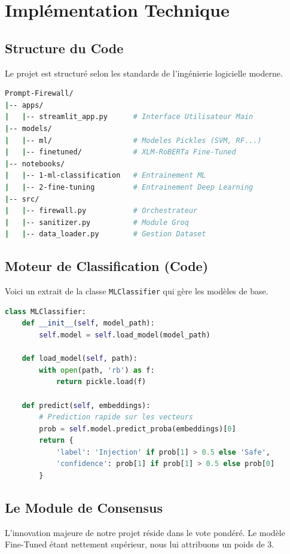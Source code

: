 \documentclass[a4paper,12pt]{report}
\begin{document}
\chapter{Implémentation Technique}

\section{Structure du Code}
Le projet est structuré selon les standards de l'ingénierie logicielle moderne.

\begin{lstlisting}[language=bash, caption=Arborescence du Projet]
Prompt-Firewall/
|-- apps/
|   |-- streamlit_app.py      # Interface Utilisateur Main
|-- models/
|   |-- ml/                   # Modeles Pickles (SVM, RF...)
|   |-- finetuned/            # XLM-RoBERTa Fine-Tuned
|-- notebooks/
|   |-- 1-ml-classification   # Entrainement ML
|   |-- 2-fine-tuning         # Entrainement Deep Learning
|-- src/
|   |-- firewall.py           # Orchestrateur
|   |-- sanitizer.py          # Module Groq
|   |-- data_loader.py        # Gestion Dataset
\end{lstlisting}

\section{Moteur de Classification (Code)}
Voici un extrait de la classe \texttt{MLClassifier} qui gère les modèles de base.

\begin{lstlisting}[language=Python, caption=Chargement et Prédiction ML]
class MLClassifier:
    def __init__(self, model_path):
        self.model = self.load_model(model_path)

    def load_model(self, path):
        with open(path, 'rb') as f:
            return pickle.load(f)

    def predict(self, embeddings):
        # Prediction rapide sur les vecteurs
        prob = self.model.predict_proba(embeddings)[0]
        return {
            'label': 'Injection' if prob[1] > 0.5 else 'Safe',
            'confidence': prob[1] if prob[1] > 0.5 else prob[0]
        }
\end{lstlisting}

\section{Le Module de Consensus}
L'innovation majeure de notre projet réside dans le vote pondéré. Le modèle Fine-Tuned étant nettement supérieur, nous lui attribuons un poids de 3.
\end{document}
